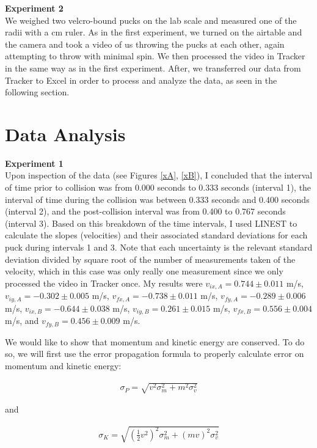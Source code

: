 \documentclass[11pt]{article}
\begin{document}
{\bf Experiment 2}\\

We weighed two velcro-bound pucks on the lab scale and measured one of the radii with a cm ruler. As in the first experiment, we turned on the airtable and the camera and took a video of us throwing the pucks at each other, again attempting to throw with minimal spin. We then processed the video in Tracker in the same way as in the first experiment. After, we transferred our data from Tracker to Excel in order to process and analyze the data, as seen in the following section.




\section{Data Analysis}

{\bf Experiment 1}\\

Upon inspection of the data (see Figures \ref{xA}, \ref{xB}), I concluded that the interval of time prior to collision was from 0.000 seconds to 0.333 seconds (interval 1), the interval of time during the collision was between 0.333 seconds and 0.400 seconds (interval 2), and the post-collision interval was from 0.400 to 0.767 seconds (interval 3). Based on this breakdown of the time intervals, I used LINEST to calculate the slopes (velocities) and their associated standard deviations for each puck during intervals 1 and 3. Note that each uncertainty is the relevant standard deviation divided by square root of the number of measurements taken of the velocity, which in this case was only really one measurement since we only processed the video in Tracker once. My results were $v_{ix,A} = 0.744\pm0.011$ m/s, $v_{iy,A} = -0.302\pm0.005$ m/s, $v_{fx,A} = -0.738\pm0.011$ m/s, $v_{fy,A} = -0.289\pm0.006$ m/s, $v_{ix,B} = -0.644\pm0.038$ m/s, $v_{iy,B} = 0.261\pm0.015$ m/s, $v_{fx,B} = 0.556\pm0.004$ m/s, and $v_{fy,B} = 0.456\pm0.009$ m/s.

We would like to show that momentum and kinetic energy are conserved. To do so, we will first use the error propagation formula to properly calculate error on momentum and kinetic energy:

\begin{align}
\sigma_{P} = \sqrt{v^2\sigma_m^2+m^2\sigma_v^2}
\end{align}

and

\begin{align}
\sigma_{K} = \sqrt{\left(\frac{1}{2}v^2\right)^2\sigma_m^2+(mv)^2\sigma_v^2}
\end{align}
\end{document}
